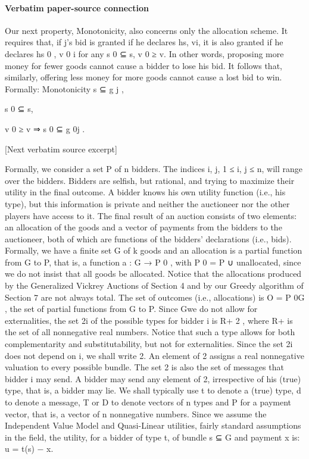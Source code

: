 \documentclass[10pt]{article}
\begin{document}
\paragraph{Verbatim paper-source connection}
\begin{ReviewVerbatim}
Our next property, Monotonicity, also concerns only the allocation scheme. It
requires that, if j’s bid is granted if he declares hs, vi, it is also granted if he
declares hs 0 , v 0 i for any s 0 ⊆ s, v 0 ≥ v. In other words, proposing more money for
fewer goods cannot cause a bidder to lose his bid. It follows that, similarly, offering
less money for more goods cannot cause a lost bid to win. Formally:
Monotonicity s ⊆ g j ,

s 0 ⊆ s,

v 0 ≥ v ⇒ s 0 ⊆ g 0j .

[Next verbatim source excerpt]

Formally, we consider a set P of n bidders. The indices i, j, 1 ≤ i, j ≤ n, will
range over the bidders. Bidders are selfish, but rational, and trying to maximize their
utility in the final outcome. A bidder knows his own utility function (i.e., his type),
but this information is private and neither the auctioneer nor the other players have
access to it. The final result of an auction consists of two elements: an allocation
of the goods and a vector of payments from the bidders to the auctioneer, both of
which are functions of the bidders’ declarations (i.e., bids). Formally, we have a
finite set G of k goods and an allocation is a partial function from G to P, that is, a
function a : G → P 0 , with P 0 = P ∪ {unallocated}, since we do not insist that all
goods be allocated. Notice that the allocations produced by the Generalized Vickrey
Auctions of Section 4 and by our Greedy algorithm of Section 7 are not always
total. The set of outcomes (i.e., allocations) is O = P 0G , the set of partial functions
from G to P. Since Gwe do not allow for externalities, the set 2i of the possible types
for bidder i is R+ 2 , where R+ is the set of all nonnegative real numbers. Notice
that such a type allows for both complementarity and substitutability, but not for
externalities. Since the set 2i does not depend on i, we shall write 2. An element
of 2 assigns a real nonnegative valuation to every possible bundle. The set 2 is
also the set of messages that bidder i may send. A bidder may send any element of
2, irrespective of his (true) type, that is, a bidder may lie. We shall typically use t
to denote a (true) type, d to denote a message, T or D to denote vectors of n types
and P for a payment vector, that is, a vector of n nonnegative numbers.
Since we assume the Independent Value Model and Quasi-Linear utilities, fairly
standard assumptions in the field, the utility, for a bidder of type t, of bundle s ⊆ G
and payment x is:
u = t(s) − x.


\end{ReviewVerbatim}
\end{document}
